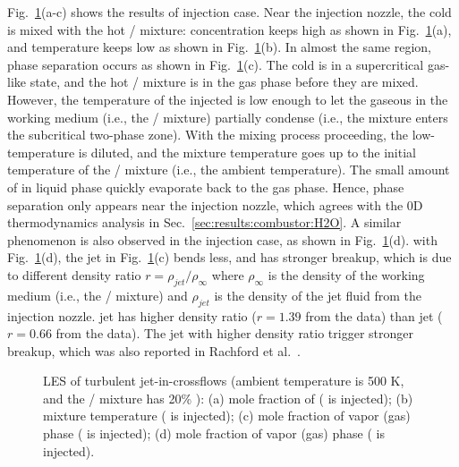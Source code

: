 Fig.~\ref{JICFr}(a-c) shows the results of  injection case. Near the injection nozzle, the cold  is mixed with the hot / mixture:  concentration keeps high as shown in Fig.~\ref{JICFr}(a), and temperature keeps low as shown in Fig.~\ref{JICFr}(b). In almost the same region, phase separation occurs as shown in Fig.~\ref{JICFr}(c). The cold  is in a supercritical gas-like state, and the hot / mixture is in the gas phase before they are mixed. However, the temperature of the injected  is low enough to let the gaseous  in the working medium (i.e., the / mixture) partially condense (i.e., the mixture enters the subcritical two-phase zone). %
With the mixing process proceeding, the low-temperature  is diluted, and the mixture temperature goes up to the initial temperature of the / mixture (i.e., the ambient temperature). The small amount of  in liquid phase quickly evaporate back to the gas phase. Hence, phase separation only appears near the injection nozzle, which agrees with the 0D thermodynamics analysis in Sec.~\ref{sec:results:combustor:H2O}. A similar phenomenon is also observed in the  injection case, as shown in Fig.~\ref{JICFr}(d).  with Fig.~\ref{JICFr}(d), the jet in Fig.~\ref{JICFr}(c) bends less, and has stronger breakup, which is due to different density ratio $r=\rho_{jet}/\rho_{\infty}$ where $\rho_{\infty}$ is the density of the working medium (i.e., the / mixture) and $\rho_{jet}$ is the density of the jet fluid from the injection nozzle.  jet has higher density ratio ($r=1.39$ from the data) than  jet ($r=0.66$ from the data). The jet with higher density ratio trigger stronger breakup, which was also reported in Rachford et al.~\cite{tretola2021effect}.

\begin{figure}[htb]
    \centering

    \caption{LES of turbulent jet-in-crossflows (ambient temperature is 500 K, and the / mixture has 20\% ): (a) mole fraction of  ( is injected); (b) mixture temperature ( is injected); (c) mole fraction of vapor (gas) phase ( is injected); (d) mole fraction of vapor (gas) phase ( is injected).}
    \label{JICFr}
\end{figure}

